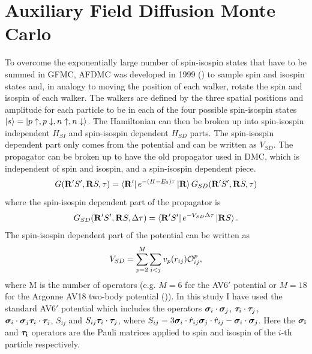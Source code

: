 \section{Auxiliary Field Diffusion Monte Carlo}
\label{sec:AFDMC}
To overcome the exponentially large number of spin-isospin states that have to be summed in GFMC, AFDMC was developed in 1999 (\cite{schmidt1999}) to sample spin and isospin states and, in analogy to moving the position of each walker, rotate the spin and isospin of each walker. The walkers are defined by the three spatial positions and amplitude for each particle to be in each of the four possible spin-isospin states $\left| s \right> = \left| p\uparrow,p\downarrow,n\uparrow,n\downarrow \right>$. The Hamiltonian can then be broken up into spin-isospin independent $H_{SI}$ and spin-isospin dependent $H_{SD}$ parts. The spin-isospin dependent part only comes from the potential and can be written as $V_{SD}$. The propagator can be broken up to have the old propagator used in DMC, which is independent of spin and isospin, and a spin-isospin dependent piece.
\begin{equation}
   G(\mathbf{R}'S',\mathbf{R} S,\tau)=\left< \mathbf{R}' \right|e^{-(H-E_0)\tau}\left| \mathbf{R} \right>G_{SD}(\mathbf{R}'S',\mathbf{R} S,\tau)
\end{equation}
where the spin-isospin dependent part of the propagator is
\begin{equation}
   G_{SD}(\mathbf{R}'S',\mathbf{R} S,\Delta\tau) = \left< \mathbf{R}'S' \right|e^{-V_{SD}\Delta\tau} \left| \mathbf{R} S \right>.
\end{equation}
The spin-isospin dependent part of the potential can be written as
\begin{equation}
   V_{SD} = \sum\limits_{p=2}^{M}\sum\limits_{i<j} v_p(r_{ij})\mathcal{O}_{ij}^p,
\end{equation}
where M is the number of operators (e.g. $M=6$ for the AV6$'$ potential or $M=18$ for the Argonne AV18 two-body potential (\cite{wiringa1984})). In this study I have used the standard AV6$'$ potential which includes the operators $\bm{\sigma}_i\cdot\bm{\sigma}_j$, $\bm{\tau}_i\cdot\bm{\tau}_j$, $\bm{\sigma}_i\cdot\bm{\sigma}_j \bm{\tau}_i\cdot\bm{\tau}_j$, $S_{ij}$ and $S_{ij} \bm{\tau}_i\cdot\bm{\tau}_j$, where $S_{ij} = 3\bm{\sigma}_i\cdot\hat{r}_{ij}\bm{\sigma}_j\cdot\hat{r}_{ij}-\bm{\sigma}_i\cdot\bm{\sigma}_j$. Here the $\mathbf{\bm{\sigma}_i}$ and $\mathbf{\bm{\tau}_i}$ operators are the Pauli matrices applied to spin and isospin of the $i$-th particle respectively.

